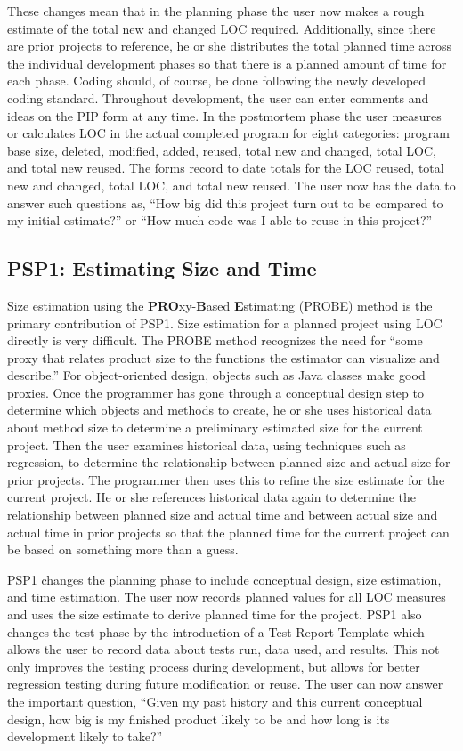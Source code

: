 These changes mean that in the planning phase the user now makes a rough
estimate of the total new and changed LOC required.  Additionally, since
there are prior projects to reference, he or she distributes the total
planned time across the individual development phases so that there is a
planned amount of time for each phase.  Coding should, of course, be done
following the newly developed coding standard.  Throughout development, the
user can enter comments and ideas on the PIP form at any time. In the
postmortem phase the user measures or calculates LOC in the actual
completed program for eight categories: program base size, deleted,
modified, added, reused, total new and changed, total LOC, and total new
reused.  The forms record to date totals for the LOC reused, total new and
changed, total LOC, and total new reused.  The user now has the data to
answer such questions as, ``How big did this project turn out to be
compared to my initial estimate?'' or ``How much code was I able to reuse
in this project?''

\subsection{PSP1: Estimating Size and Time}

Size estimation using the {\bf PRO}xy-{\bf B}ased {\bf E}stimating (PROBE)
method is the primary contribution of PSP1.  Size estimation for a planned
project using LOC directly is very difficult.  The PROBE method recognizes
the need for ``some proxy that relates product size to the functions the
estimator can visualize and describe.'' \cite{Humphrey95} For
object-oriented design, objects such as Java classes make good proxies.
Once the programmer has gone through a conceptual design step to determine
which objects and methods to create, he or she uses historical data about
method size to determine a preliminary estimated size for the current
project.  Then the user examines historical data, using techniques such as
regression, to determine the relationship between planned size and actual
size for prior projects.  The programmer then uses this to refine the size
estimate for the current project.  He or she references historical data
again to determine the relationship between planned size and actual time
and between actual size and actual time in prior projects so that the
planned time for the current project can be based on something more than a
guess.


PSP1 changes the planning phase to include conceptual design, size
estimation, and time estimation.  The user now records planned values for
all LOC measures and uses the size estimate to derive planned time for the
project.  PSP1 also changes the test phase by the introduction of a Test
Report Template which allows the user to record data about tests run, data
used, and results.  This not only improves the testing process during
development, but allows for better regression testing during future
modification or reuse.  The user can now answer the important question,
``Given my past history and this current conceptual design, how big is my
finished product likely to be and how long is its development likely to
take?''
 
